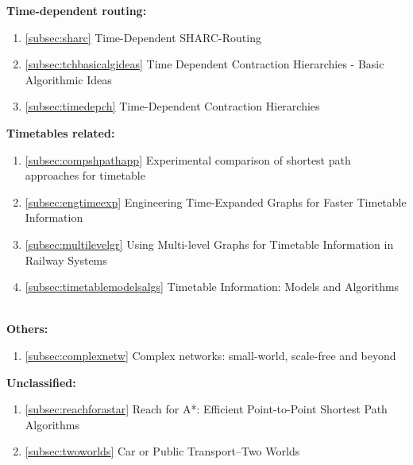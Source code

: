 \documentclass[a4paper]{article}
\begin{document}
        \textbf{Time-dependent routing: }
        \begin{enumerate}
            \item \ref{subsec:sharc} Time-Dependent SHARC-Routing ~\cite{sharc08}
            \item \ref{subsec:tchbasicalgideas} Time Dependent Contraction Hierarchies - Basic Algorithmic Ideas ~\cite{tchbasicalgideas08}
            \item \ref{subsec:timedepch} Time-Dependent Contraction Hierarchies ~\cite{timedepch09}
        \end{enumerate}
        \hspace*{\fill}

        \textbf{Timetables related: }
        \begin{enumerate}
            \item \ref{subsec:compshpathapp} Experimental comparison of shortest path approaches for timetable ~\cite{compshpathapp04}
            \item \ref{subsec:engtimeexp} Engineering Time-Expanded Graphs for Faster Timetable Information ~\cite{engtimeexp09}
            \item \ref{subsec:multilevelgr} Using Multi-level Graphs for Timetable Information in Railway Systems ~\cite{multilevelgr02}
            \item \ref{subsec:timetablemodelsalgs} Timetable Information: Models and Algorithms ~\cite{timetablemodelsalgs07}
        \end{enumerate}
        \hspace*{\fill}

        \textbf{Others: }
        \begin{enumerate}
            \item \ref{subsec:complexnetw} Complex networks: small-world, scale-free and beyond ~\cite{complexnetw03}
        \end{enumerate}
        \hspace*{\fill}

        \textbf{Unclassified: }
        \begin{enumerate}
            \item \ref{subsec:reachforastar} Reach for A*: Efficient Point-to-Point Shortest Path Algorithms ~\cite{reachforastar06}
            \item \ref{subsec:twoworlds} Car or Public Transport--Two Worlds ~\cite{twoworlds09}
        \end{enumerate}
        \hspace*{\fill}
\end{document}
